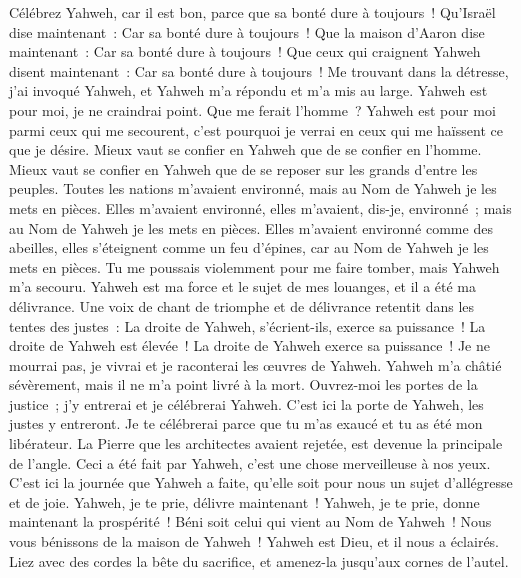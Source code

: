 \begin{multicols}{2}
\VerseOne{}Célébrez Yahweh, car il est bon, parce que sa bonté dure à toujours~!
Qu'Israël dise maintenant~: Car sa bonté dure à toujours~!
Que la maison d'Aaron dise maintenant~: Car sa bonté dure à toujours~!
Que ceux qui craignent Yahweh disent maintenant~: Car sa bonté dure à toujours~!
Me trouvant dans la détresse, j'ai invoqué Yahweh, et Yahweh m'a répondu et m'a mis au large.
Yahweh est pour moi, je ne craindrai point. Que me ferait l'homme~?
Yahweh est pour moi parmi ceux qui me secourent, c'est pourquoi je verrai en ceux qui me haïssent ce que je désire.
Mieux vaut se confier en Yahweh que de se confier en l'homme.
Mieux vaut se confier en Yahweh que de se reposer sur les grands d'entre les peuples.
Toutes les nations m'avaient environné, mais au Nom de Yahweh je les mets en pièces.
Elles m'avaient environné, elles m'avaient, dis-je, environné~; mais au Nom de Yahweh je les mets en pièces.
Elles m'avaient environné comme des abeilles, elles s'éteignent comme un feu d'épines, car au Nom de Yahweh je les mets en pièces.
Tu me poussais violemment pour me faire tomber, mais Yahweh m'a secouru.
Yahweh est ma force et le sujet de mes louanges, et il a été ma délivrance.
Une voix de chant de triomphe et de délivrance retentit dans les tentes des justes~: La droite de Yahweh, s'écrient-ils, exerce sa puissance~!
La droite de Yahweh est élevée~! La droite de Yahweh exerce sa puissance~!
Je ne mourrai pas, je vivrai et je raconterai les œuvres de Yahweh.
Yahweh m'a châtié sévèrement, mais il ne m'a point livré à la mort.
Ouvrez-moi les portes de la justice~; j'y entrerai et je célébrerai Yahweh.
C'est ici la porte de Yahweh, les justes y entreront.
Je te célébrerai parce que tu m'as exaucé et tu as été mon libérateur.
La Pierre que les architectes avaient rejetée, est devenue la principale de l'angle.
Ceci a été fait par Yahweh, c'est une chose merveilleuse à nos yeux.
C'est ici la journée que Yahweh a faite, qu'elle soit pour nous un sujet d'allégresse et de joie.
Yahweh, je te prie, délivre maintenant~! Yahweh, je te prie, donne maintenant la prospérité~!
Béni soit celui qui vient au Nom de Yahweh~! Nous vous bénissons de la maison de Yahweh~!
Yahweh est Dieu, et il nous a éclairés. Liez avec des cordes la bête du sacrifice, et amenez-la jusqu'aux cornes de l'autel.

\end{multicols}
